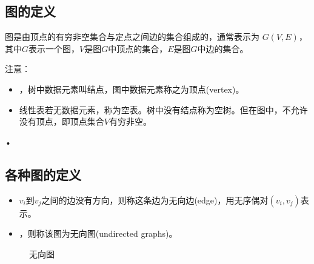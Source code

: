\subsection{图的定义}

\begin{frame}\ft{\subsecname}
\begin{dingyi}
图是由顶点的有穷非空集合与定点之间边的集合组成的，通常表示为
$G(V,E)$，其中$G$表示一个图，$V$是图$G$中顶点的集合，$E$是图$G$中边的集合。
\end{dingyi}
\end{frame}


\begin{frame}\ft{\subsecname}

\begin{figure}
\centering

\end{figure}
\end{frame}




\begin{frame}\ft{\subsecname}
注意：
\begin{itemize}
\item 
{}，树中数据元素叫结点，图中数据元素称之为顶点(vertex)。\\[0.1in]
\item 
线性表若无数据元素，称为空表。树中没有结点称为空树。但在图中，不允许没有顶点，即顶点集合$V$有穷非空。
\end{itemize}•
\end{frame}


\subsection{各种图的定义}
\begin{frame}\ft{\subsubsecname}
\begin{dingyi}[无向图]
\begin{itemize}
\item 
{}$v_i$到$v_j$之间的边没有方向，则称这条边为无向边(edge)，用无序偶对$(v_i,v_j)$表示。\\[0.1in]
\item
{}，则称该图为无向图(undirected graphs)。
\end{itemize}
\end{dingyi}
\end{frame}

\begin{frame}\ft{\subsubsecname}
\begin{figure}
\centering

\caption{无向图}
\end{figure}
\end{frame}

